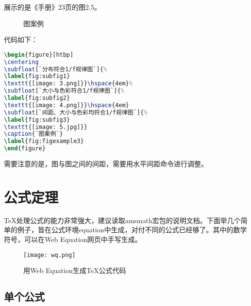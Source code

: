 展示的是《手册》23页的图2.5。

\begin{figure}[htbp]
\centering
{}\hspace{4em}%
\hspace{4em}
\caption{图案例}
\label{fig:figexample3}
\end{figure}

代码如下：

\begin{lstlisting}[language=TeX]
\begin{figure}[htbp]
\centering
\subfloat[`分布符合1/f规律图`]{%
\label{fig:subfig1}
\texttt{[image: 3.png]}}\hspace{4em}%
\subfloat[`大小与色彩符合1/f规律图`]{%
\label{fig:subfig2}
\texttt{[image: 4.png]}}\hspace{4em}
\subfloat[`间距、大小与色彩均符合1/f规律图`]{%
\label{fig:subfig3}
\texttt{[image: 5.jpg]}}
\caption{`图案例`}
\label{fig:figexample3}
\end{figure}
\end{lstlisting}

需要注意的是，图与图之间的间距，需要用水平间距命令进行调整。

\section{公式定理}
\TeX{}处理公式的能力非常强大，建议读取amsmath宏包的说明文档\textsuperscript{\cite{amsmath}}。下面举几个简单的例子，皆在公式环境equation中生成，对付不同的公式已经够了。其中的数学符号，可以在Web Equation网页中手写生成。

\begin{figure}[htbp]
\begin{center}
\texttt{[image: wq.png]}
\end{center}
\caption{用Web Equation生成\TeX{}公式代码}
\end{figure}

\subsection{单个公式}


